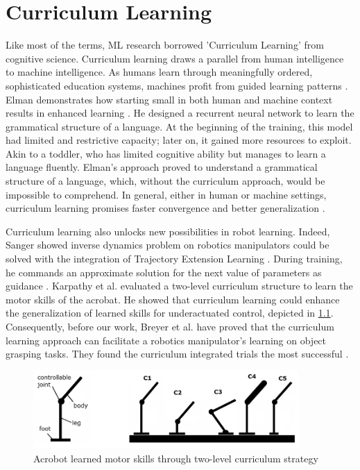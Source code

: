 \chapter{Curriculum Learning}

Like most of the terms, ML research borrowed 'Curriculum Learning' from cognitive science. Curriculum learning draws a parallel from human intelligence to machine intelligence. As humans learn through meaningfully ordered, sophisticated education systems, machines profit from guided learning patterns \cite{Bengio2009}. Elman demonstrates how starting small in both human and machine context results in enhanced learning \cite{Elman1993}. He designed a recurrent neural network to learn the grammatical structure of a language. At the beginning of the training, this model had limited and restrictive capacity; later on, it gained more resources to exploit. Akin to a toddler, who has limited cognitive ability but manages to learn a language fluently. Elman's approach proved to understand a grammatical structure of a language, which, without the curriculum approach, would be impossible to comprehend. In general, either in human or machine settings, curriculum learning promises faster convergence and better generalization \cite{Bengio2009}. 

Curriculum learning also unlocks new possibilities in robot learning. Indeed, Sanger showed inverse dynamics problem on robotics manipulators could be solved with the integration of Trajectory Extension Learning \cite{Sanger1994}. During training, he commands an approximate solution for the next value of parameters as guidance \cite{Sanger1994}. Karpathy et al. evaluated a two-level curriculum structure to learn the motor skills of the acrobat. He showed that curriculum learning could enhance the generalization of learned skills for underactuated control, depicted in \ref{fig:curriculum}. Consequently, before our work, Breyer et al. have proved that the curriculum learning approach can facilitate a robotics manipulator's learning on object grasping tasks. They found the curriculum integrated trials the most successful \cite{Breyer2018}.

\begin{figure}[htbp]
    \centering
      \includegraphics[width=0.9\textwidth]{figures/acrobot}
    \caption{Acrobot learned motor skills through two-level curriculum strategy \cite{Karpathy2012}}
    \label{fig:curriculum}
\end{figure}

